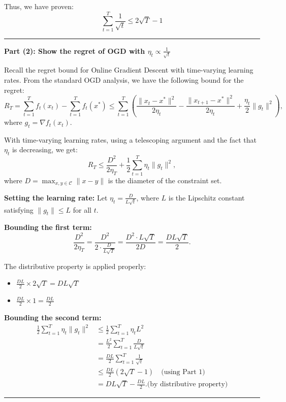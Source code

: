 \documentclass[12pt,letterpaper]{article}
\newenvironment{proof}{\noindent{\bf Proof:}}{\qed\bigskip}
\newcommand{\qed}{\rule{7pt}{7pt}}
\begin{document}
\begin{enumerate}
\begin{proof}
Thus, we have proven:
\[
\boxed{\sum_{t=1}^{T}\frac{1}{\sqrt{t}} \leq 2\sqrt{T} - 1}
\]
\end{proof}

\bigskip

\textbf{Part (2): Show the regret of OGD with $\eta_t \propto \frac{1}{\sqrt{t}}$}

\begin{proof}
Recall the regret bound for Online Gradient Descent with time-varying learning rates. From the standard OGD analysis, we have the following bound for the regret:
\[
R_T = \sum_{t=1}^{T}f_t(x_t) - \sum_{t=1}^{T}f_t(x^*) \leq \sum_{t=1}^{T}\left(\frac{\|x_t - x^*\|^2}{2\eta_t} - \frac{\|x_{t+1} - x^*\|^2}{2\eta_t} + \frac{\eta_t}{2}\|g_t\|^2\right),
\]
where $g_t = \nabla f_t(x_t)$.

With time-varying learning rates, using a telescoping argument and the fact that $\eta_t$ is decreasing, we get:
\[
R_T \leq \frac{D^2}{2\eta_T} + \frac{1}{2}\sum_{t=1}^{T}\eta_t \|g_t\|^2,
\]
where $D = \max_{x,y \in \mathcal{C}}\|x - y\|$ is the diameter of the constraint set.

\bigskip

\textbf{Setting the learning rate:} Let $\eta_t = \frac{D}{L\sqrt{t}}$, where $L$ is the Lipschitz constant satisfying $\|g_t\| \leq L$ for all $t$.

\bigskip

\textbf{Bounding the first term:}
\[
\frac{D^2}{2\eta_T} = \frac{D^2}{2 \cdot \frac{D}{L\sqrt{T}}} = \frac{D^2 \cdot L\sqrt{T}}{2D} = \frac{DL\sqrt{T}}{2}.
\]

The distributive property is applied properly:
\begin{itemize}
    \item $\frac{DL}{2} \times 2\sqrt{T} = DL\sqrt{T}$
    \item $\frac{DL}{2} \times 1 = \frac{DL}{2}$
\end{itemize}

\textbf{Bounding the second term:}
\begin{align*}
\frac{1}{2}\sum_{t=1}^{T}\eta_t\|g_t\|^2 &\leq \frac{1}{2}\sum_{t=1}^{T}\eta_t L^2 \\
&= \frac{L^2}{2}\sum_{t=1}^{T}\frac{D}{L\sqrt{t}} \\
&= \frac{DL}{2}\sum_{t=1}^{T}\frac{1}{\sqrt{t}} \\
&\leq \frac{DL}{2}(2\sqrt{T} - 1) \quad \text{(using Part 1)} \\
&= DL\sqrt{T} - \frac{DL}{2}.\text{(by distributive property)}
\end{align*}


\end{proof}
\end{enumerate}
\end{document}
